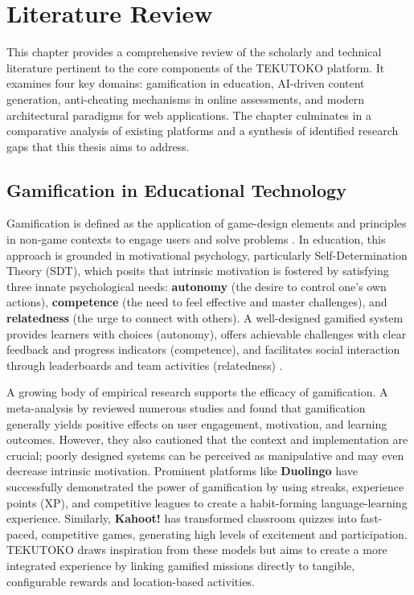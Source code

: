 \chapter{Literature Review}
\label{chap:lit-review}

This chapter provides a comprehensive review of the scholarly and technical literature pertinent to the core components of the TEKUTOKO platform. It examines four key domains: gamification in education, AI-driven content generation, anti-cheating mechanisms in online assessments, and modern architectural paradigms for web applications. The chapter culminates in a comparative analysis of existing platforms and a synthesis of identified research gaps that this thesis aims to address.

\section{Gamification in Educational Technology}
\label{sec:lit-gamification}
Gamification is defined as the application of game-design elements and principles in non-game contexts to engage users and solve problems \citep{deterding2011}. In education, this approach is grounded in motivational psychology, particularly Self-Determination Theory (SDT), which posits that intrinsic motivation is fostered by satisfying three innate psychological needs: \textbf{autonomy} (the desire to control one's own actions), \textbf{competence} (the need to feel effective and master challenges), and \textbf{relatedness} (the urge to connect with others). A well-designed gamified system provides learners with choices (autonomy), offers achievable challenges with clear feedback and progress indicators (competence), and facilitates social interaction through leaderboards and team activities (relatedness) \citep{kapp2012}.

A growing body of empirical research supports the efficacy of gamification. A meta-analysis by \citet{hamari2014} reviewed numerous studies and found that gamification generally yields positive effects on user engagement, motivation, and learning outcomes. However, they also cautioned that the context and implementation are crucial; poorly designed systems can be perceived as manipulative and may even decrease intrinsic motivation. Prominent platforms like \textbf{Duolingo} have successfully demonstrated the power of gamification by using streaks, experience points (XP), and competitive leagues to create a habit-forming language-learning experience. Similarly, \textbf{Kahoot!} has transformed classroom quizzes into fast-paced, competitive games, generating high levels of excitement and participation. TEKUTOKO draws inspiration from these models but aims to create a more integrated experience by linking gamified missions directly to tangible, configurable rewards and location-based activities.


